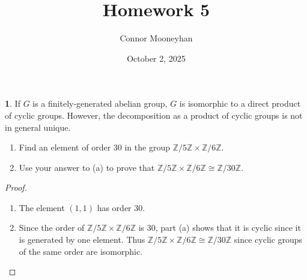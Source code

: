 \documentclass[12pt]{article}
\title{Homework 5}
\author{Connor Mooneyhan}
\date{October 2, 2025}
\theoremstyle{definition}
\newtheorem{ex}{}
\begin{document}
\maketitle

\begin{ex}
	If $G$ is a finitely-generated abelian group, $G$ is isomorphic to a direct
	product of cyclic groups. However, the decomposition as a product of cyclic
	groups is not in general unique.
	\begin{enumerate}[label=(\alph*)]
		\item Find an element of order $30$ in the group $\mathbb{Z}/5\mathbb{Z} \times \mathbb{Z}/6\mathbb{Z}$.
		\item Use your answer to (a) to prove that $\mathbb{Z}/5\mathbb{Z} \times \mathbb{Z}/6\mathbb{Z} \cong \mathbb{Z}/30\mathbb{Z}$.
	\end{enumerate}
\end{ex}
\begin{proof}\
	\begin{enumerate}[label=(\alph*)]
		\item The element $(1, 1)$ has order 30.
		\item Since the order of $\mathbb{Z}/5 \mathbb{Z} \times \mathbb{Z}/6 \mathbb{Z}$ is 30, part (a) shows that it is cyclic since it is generated by one element.
		      Thus $\mathbb{Z}/5\mathbb{Z} \times \mathbb{Z}/6\mathbb{Z} \cong \mathbb{Z}/30\mathbb{Z}$ since cyclic groups of the same order are isomorphic.
	\end{enumerate}
\end{proof}
\end{document}
